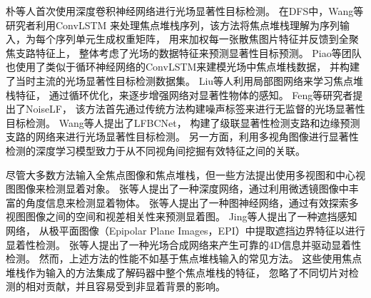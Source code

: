 朴等人首次使用深度卷积神经网络进行光场显著性目标检测。
在DFS中，Wang等研究者利用ConvLSTM
来处理焦点堆栈序列，该方法将焦点堆栈理解为序列输入，为每个序列单元生成权重矩阵，
用来加权每一张散焦图片特征并反馈到全聚焦支路特征上，
整体考虑了光场的数据特征来预测显著性目标预测。
Piao等团队也使用了类似于循环神经网络的ConvLSTM来建模光场中焦点堆栈数据，
并构建了当时主流的光场显著性目标检测数据集。
Liu等人利用局部图网络来学习焦点堆栈特征，
通过循环优化，来逐步增强网络对显著性物体的感知。
Feng等研究者提出了NoiseLF，
该方法首先通过传统方法构建噪声标签来进行无监督的光场显著性目标检测。
Wang等人提出了LFBCNet，
构建了级联显著性检测支路和边缘预测支路的网络来进行光场显著性目标检测。
另一方面，利用多视角图像进行显著性检测的深度学习模型致力于从不同视角间挖掘有效特征之间的关联。







尽管大多数方法输入全焦点图像和焦点堆栈，但一些方法提出使用多视图和中心视图图像来检测显着对象。 
张等人提出了一种深度网络，通过利用微透镜图像中丰富的角度信息来检测显着物体。 
张等人提出了一种图神经网络，通过有效探索多视图图像之间的空间和视差相关性来预测显着图。 
Jing等人提出了一种遮挡感知网络，
从极平面图像（Epipolar Plane Images，EPI）中提取遮挡边界特征以进行显着性检测。 
张等人提出了一种光场合成网络来产生可靠的4D信息并驱动显着性检测。 
然而，上述方法的性能不如基于焦点堆栈输入的常见方法。 
这些使用焦点堆栈作为输入的方法集成了解码器中整个焦点堆栈的特征，
忽略了不同切片对检测的相对贡献，并且容易受到非显着背景的影响。 


